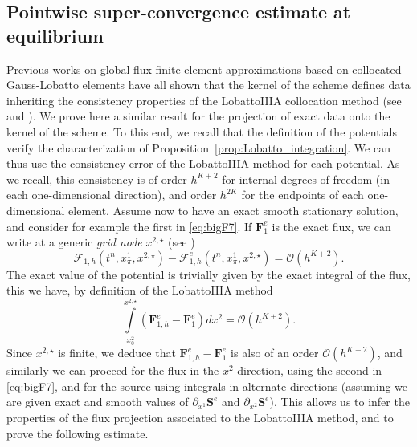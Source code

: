 \documentclass[a4paper,10pt]{article}
\begin{document}
\subsection{Pointwise super-convergence estimate at equilibrium}
Previous works on global flux finite element approximations based on collocated Gauss-Lobatto elements have all shown  that the kernel
of the scheme defines data inheriting the consistency properties of the LobattoIIIA  collocation method (see \cite{mantri2024fully,barsukow2025structure,barsukow2025stationaritypreservingnodalfinite} and \cite{Hairer1993}).
We prove here a similar result for the projection of exact data onto the kernel of the scheme. To this end, we recall that the definition of the potentials
verify the characterization of Proposition~\ref{prop:Lobatto_integration}. We can thus use the consistency error of the  LobattoIIIA method for each potential.
As we recall, this consistency is of order $h^{K+2}$ for internal degrees of freedom (in each one-dimensional direction), and order $h^{2K}$ for the endpoints of each one-dimensional element.
Assume now to have an exact smooth stationary solution, and consider for example   the first in \eqref{eq:bigF7}. If $\mathbf{F}_1^e$ is the exact flux, 
we can   write at a generic \emph{grid node} $x^{2,\star}$ (see \cite[Chapter 7]{Hairer1993})
\begin{equation}\label{eq:L3A_estimate1}
\mathcal{F}_{1,h}(t^n,x^1_{{\pi}}, x^{2,\star}) -\mathcal{F}_{1,h}^e(t^n,x^1_{{\pi}}, x^{2,\star}) = \mathcal{O}(h^{K+2}).
\end{equation}
The exact value of the potential is trivially given by the exact integral of the flux, this we have, by definition of the LobattoIIIA method   
\begin{equation}\label{eq:L3A_estimate2}
\int\limits_{x^2_0}^{x^{2,\star}}(\mathbf{F}_{1,h}^e   -\mathbf{F}_1^e)d x^2 = \mathcal{O}(h^{K+2}).
\end{equation}
Since $x^{2,\star}$ is finite, we deduce that $\mathbf{F}_{1,h}^e  -\mathbf{F}_1^e$ is also of an order $\mathcal{O}(h^{K+2})$, and similarly we can proceed for the flux in the $x^2$ direction,
using the second in \eqref{eq:bigF7}, and for the source using integrals in alternate directions (assuming we are given exact and smooth values of $\partial_{x^1}\mathbf{S}^e$ and $\partial_{x^2}\mathbf{S}^e$).
This allows us to infer   the properties of the  flux projection associated to the LobattoIIIA method, and to prove the following  estimate. 
\end{document}
